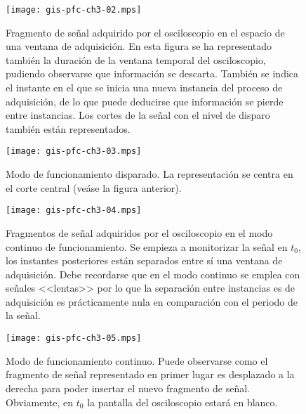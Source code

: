 \documentclass[a4paper,12pt]{article}
\begin{document}
\begin{figure}
	\begin{center}
		\texttt{[image: gis-pfc-ch3-02.mps]}
	\end{center}
	\caption[Fragmento de señal adquirido por el osciloscopio en el espacio de una ventana de adquisición]{Fragmento de señal adquirido por el osciloscopio en el espacio de una ventana de adquisición. En esta figura se ha representado también la duración de la ventana temporal del osciloscopio, pudiendo observarse que información se descarta. También se indica el instante en el que se inicia una nueva instancia del proceso de adquisición, de lo que puede deducirse que información se pierde entre instancias. Los cortes de la señal con el nivel de disparo también están representados.}
	\label{fig:freesignal}
\end{figure}

\clearpage

\begin{figure}
	\begin{center}
		\texttt{[image: gis-pfc-ch3-03.mps]}
	\end{center}
	\caption[Modo de funcionamiento disparado]{Modo de funcionamiento disparado. La representación se centra en el corte central (veáse la figura anterior).}
	\label{fig:digtrigosc}
\end{figure}

\begin{figure}
	\begin{center}
		\texttt{[image: gis-pfc-ch3-04.mps]}
	\end{center}
	\caption[Fragmentos de señal ordenados según llegan al osciloscopio]{Fragmentos de señal adquiridos por el osciloscopio en el modo continuo de funcionamiento. Se empieza a monitorizar la señal en $t_0$, los instantes posteriores están separados entre sí una ventana de adquisición. Debe recordarse que en el modo continuo se emplea con señales <<lentas>> por lo que la separación entre instancias es de adquisición es prácticamente nula en comparación con el periodo de la señal.}
	\label{fig:freesignalcont}
\end{figure}

\begin{figure}
	\begin{center}
		\texttt{[image: gis-pfc-ch3-05.mps]}
	\end{center}
	\caption[Modo de funcionamiento continuo del osciloscopio]{Modo de funcionamiento continuo. Puede observarse como el fragmento de señal representado en primer lugar es desplazado a la derecha para poder insertar el nuevo fragmento de señal. Obviamente, en $t_0$ la pantalla del osciloscopio estará en blanco.}
	\label{fig:digcontosc}
\end{figure}
\end{document}
